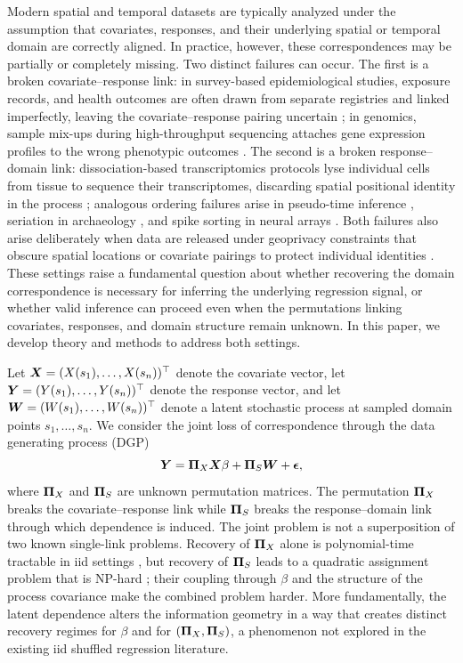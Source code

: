 \documentclass[numsec,webpdf,modern,medium,namedate]{oup-authoring-template}
\theoremstyle{thmstyleone}%
\theoremstyle{thmstyletwo}%
\theoremstyle{thmstylethree}%
\begin{document}
Modern spatial and temporal datasets are typically analyzed under the assumption
that covariates, responses, and their underlying spatial or temporal domain are
correctly aligned.
In practice, however, these correspondences may be partially or completely
missing.
Two distinct failures can occur.
The first is a broken covariate--response link: in survey-based epidemiological
studies, exposure records, and health outcomes are often drawn from separate
registries and linked imperfectly, leaving the covariate--response pairing
uncertain \citep{lahiri2005regression}; in genomics, sample mix-ups during
high-throughput sequencing attaches gene expression profiles to the wrong
phenotypic outcomes \citep{westra2011mixupmapper}.
The second is a broken response--domain link: dissociation-based transcriptomics
protocols lyse individual cells from tissue to sequence their transcriptomes,
discarding spatial positional identity in the process \citep{nitzan2019charting};
analogous ordering failures arise in pseudo-time inference
\citep{gu2022bayesian}, seriation in archaeology \citep{banning2020seriation},
and spike sorting in neural arrays \citep{rossant2016spike}. 
Both failures also arise deliberately when data are released under geoprivacy
constraints that obscure spatial locations or covariate pairings to protect
individual identities \citep{lin2023geo, cassa2008re}.
These settings raise a fundamental question about whether recovering the domain correspondence is necessary for inferring the underlying regression signal, or whether valid inference can proceed even when the permutations linking covariates, responses, and domain structure remain unknown. In this paper, we develop theory and methods to address both settings.

Let $\boldsymbol{X}=(X(s_1),\dots,X(s_n))^\top$ denote the covariate vector, let
$\boldsymbol{Y}=(Y(s_1),\dots,Y(s_n))^\top$ denote the response vector, and let
$\boldsymbol{W}=(W(s_1),\dots,W(s_n))^\top$ denote a latent stochastic process at
sampled domain points $s_1,\dots,s_n$.
We consider the joint loss of correspondence through the data generating process (DGP)
\begin{equation}
\label{eq:dgp}
\boldsymbol{Y}=\boldsymbol{\Pi}_X \boldsymbol{X} \beta+\boldsymbol{\Pi}_S \boldsymbol{W}+\boldsymbol{\epsilon},
\end{equation}
where $\boldsymbol{\Pi}_X$ and $\boldsymbol{\Pi}_S$ are unknown permutation matrices.
The permutation $\boldsymbol{\Pi}_X$ breaks the covariate--response link while $\boldsymbol{\Pi}_S$
breaks the response--domain link through which dependence is induced.
The joint problem is not a superposition of two known single-link problems.
Recovery of $\boldsymbol{\Pi}_X$ alone is polynomial-time tractable in iid settings
\citep{zhang2020optimal}, but recovery of $\boldsymbol{\Pi}_S$ leads to a quadratic
assignment problem that is NP-hard \citep{loiola2007}; their coupling through
$\beta$ and the structure of the process covariance make the combined
problem harder.
More fundamentally, the latent dependence alters the information geometry in a
way that creates distinct recovery regimes for $\beta$ and for $(\boldsymbol{\Pi}_X,\boldsymbol{\Pi}_S)$,
a phenomenon not explored in the existing iid shuffled regression literature.
\end{document}
